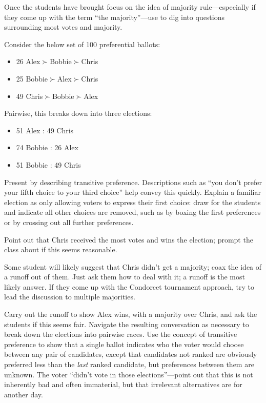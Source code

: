 Once the students have brought focus on the idea of majority rule—especially if they come up with the term ``the majority''—use  to dig into questions surrounding most votes and majority.

\begin{election}
    \singlespacing
    \label{ele:opener}
    Consider the below set of 100 preferential ballots:
    \begin{itemize}
        \item 26 Alex$\succ$Bobbie$\succ$Chris
        \item 25 Bobbie$\succ$Alex$\succ$Chris
        \item 49 Chris$\succ$Bobbie$\succ$Alex
    \end{itemize}

    Pairwise, this breaks down into three elections:

    \begin{itemize}
        \item 51 Alex : 49 Chris
        \item 74 Bobbie : 26 Alex
        \item 51 Bobbie : 49 Chris
    \end{itemize}
\end{election}

Present  by describing transitive preference.  Descriptions such as ``you don't prefer your fifth choice to your third choice'' help convey this quickly.  Explain a familiar election as only allowing voters to express their first choice:  draw  for the students and indicate all other choices are removed, such as by boxing the first preferences or by crossing out all further preferences.

Point out that Chris received the most votes and wins the election; prompt the class about if this seems reasonable.

\begin{boxcomment}
    Some student will likely suggest that Chris didn't get a majority; coax the idea of a runoff out of them.  Just ask them how to deal with it; a runoff is the most likely answer.  If they come up with the Condorcet tournament approach, try to lead the discussion to multiple majorities.
\end{boxcomment}

Carry out the runoff to show Alex wins, with a majority over Chris, and ask the students if this seems fair.  Navigate the resulting conversation as necessary to break down the elections into pairwise races.  Use the concept of transitive preference to show that a single ballot indicates who the voter would choose between any pair of candidates, except that candidates not ranked are obviously preferred less than the \textit{last} ranked candidate, but preferences between them are unknown.  The voter ``didn't vote in those elections''—point out that this is not inherently bad and often immaterial, but that irrelevant alternatives are for another day.

